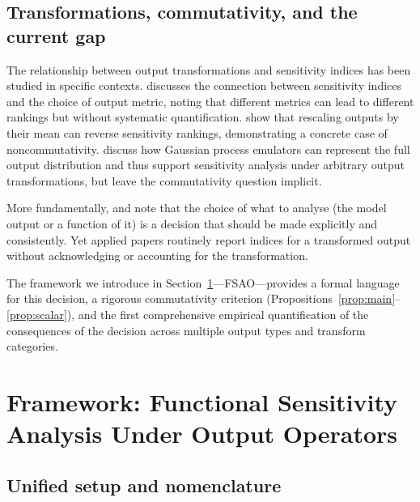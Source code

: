 \documentclass[11pt,onecolumn]{article}
\begin{document}
\subsection{Transformations, commutativity, and the current gap}
\label{sec:lit_gap}

The relationship between output transformations and sensitivity indices has been
studied in specific contexts. \citet{Pianosi2016} discusses the connection between
sensitivity indices and the choice of output metric, noting that different
metrics can lead to different rankings but without systematic quantification.
\citet{Puy2022} show that rescaling outputs by their mean can reverse sensitivity
rankings, demonstrating a concrete case of noncommutativity. \citet{Oakley2004}
discuss how Gaussian process emulators can represent the full output distribution
and thus support sensitivity analysis under arbitrary output transformations,
but leave the commutativity question implicit.

More fundamentally, \citet{Saltelli2008} and \citet{IoossLemaitre2015} note
that the choice of what to analyse (the model output or a function of it) is
a decision that should be made explicitly and consistently. Yet applied papers
routinely report indices for a transformed output without acknowledging or
accounting for the transformation.

The framework we introduce in Section~\ref{sec:framework}---FSAO---provides
a formal language for this decision, a rigorous commutativity criterion
(Propositions~\ref{prop:main}--\ref{prop:scalar}), and the first comprehensive
empirical quantification of the consequences of the decision across multiple
output types and transform categories.

\section{Framework: Functional Sensitivity Analysis Under Output Operators}
\label{sec:framework}

\subsection{Unified setup and nomenclature}
\label{sec:nomenclature}
\end{document}
